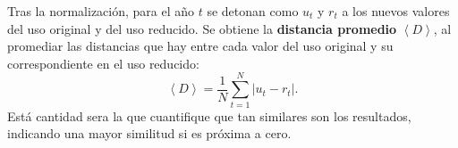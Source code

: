 

Tras la normalización, para el año $t$ se detonan como $u_{t}$ y $r_{t}$ a los nuevos valores del uso original y del uso reducido. Se obtiene la \textbf{distancia promedio} $\left\langle D \right\rangle $, al promediar las distancias que hay entre cada valor del uso original y su correspondiente en el uso reducido: 
\begin{equation}
\left\langle D \right\rangle  = \frac{1}{N}\sum_{t=1}^{N} \left| u_{t} - r_{t} \right|  .
\label{ec.Distancia_prom}
\end{equation}
Está cantidad sera la que cuantifique que tan similares son los resultados, indicando una mayor similitud si es próxima a cero. 



